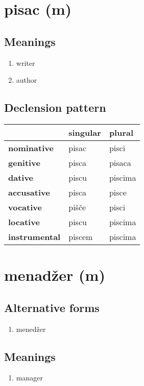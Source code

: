 \filbreak
\section{pisac (m)}
\subsection*{Meanings}
\begin{enumerate}
\item writer
\item author
\end{enumerate}
\subsection*{Declension pattern}
\begin{tabularx}{\linewidth}{Xll}
\toprule
{} & singular &   plural \\
\midrule
\textbf{nominative  } &    pisac &    pisci \\
\textbf{genitive    } &    pisca &   pisaca \\
\textbf{dative      } &    piscu &  piscima \\
\textbf{accusative  } &    pisca &    pisce \\
\textbf{vocative    } &    pišče &    pisci \\
\textbf{locative    } &    piscu &  piscima \\
\textbf{instrumental} &   piscem &  piscima \\
\bottomrule
\end{tabularx}

\filbreak
\section{menadžer (m)}
\subsection*{Alternative forms}
\begin{enumerate}
\item menedžer
\end{enumerate}
\subsection*{Meanings}
\begin{enumerate}
\item manager
\end{enumerate}
